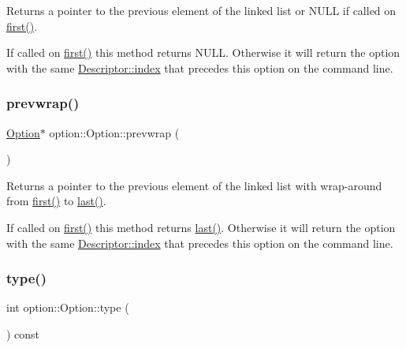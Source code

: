 Returns a pointer to the previous element of the linked list or N\+U\+LL if called on \hyperlink{classoption_1_1Option_abb4e13cd7c90999c8a6b1f871cece283}{first()}. 

If called on \hyperlink{classoption_1_1Option_abb4e13cd7c90999c8a6b1f871cece283}{first()} this method returns N\+U\+LL. Otherwise it will return the option with the same \hyperlink{structoption_1_1Descriptor_a1fee8ac44f529c99ac2b1149b4c391b1}{Descriptor\+::index} that precedes this option on the command line. \mbox{\label{classoption_1_1Option_a1226e45dc2de30f269b2aff1784bbee7}} 
\subsubsection{\texorpdfstring{prevwrap()}{prevwrap()}}
{\footnotesize\ttfamily \hyperlink{classoption_1_1Option}{Option}$\ast$ option\+::\+Option\+::prevwrap (\begin{DoxyParamCaption}{ }\end{DoxyParamCaption})\hspace{0.3cm}{\ttfamily [inline]}}



Returns a pointer to the previous element of the linked list with wrap-\/around from \hyperlink{classoption_1_1Option_abb4e13cd7c90999c8a6b1f871cece283}{first()} to \hyperlink{classoption_1_1Option_afe2aff68191e55b59c53fac3dbbcd7c3}{last()}. 

If called on \hyperlink{classoption_1_1Option_abb4e13cd7c90999c8a6b1f871cece283}{first()} this method returns \hyperlink{classoption_1_1Option_afe2aff68191e55b59c53fac3dbbcd7c3}{last()}. Otherwise it will return the option with the same \hyperlink{structoption_1_1Descriptor_a1fee8ac44f529c99ac2b1149b4c391b1}{Descriptor\+::index} that precedes this option on the command line. \mbox{\label{classoption_1_1Option_a5268a69e1a91137186ab772574296da0}} 
\subsubsection{\texorpdfstring{type()}{type()}}
{\footnotesize\ttfamily int option\+::\+Option\+::type (\begin{DoxyParamCaption}{ }\end{DoxyParamCaption}) const\hspace{0.3cm}{\ttfamily [inline]}}



